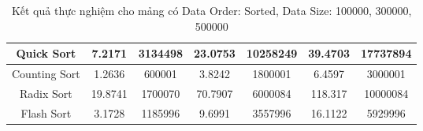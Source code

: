 \begin{table}[H]
{\begin{tabular}{|ccccccc|}
\multicolumn{1}{|c|}{Quick Sort} & \multicolumn{1}{c|}{7.2171} & \multicolumn{1}{c|}{3134498} & \multicolumn{1}{c|}{23.0753} & \multicolumn{1}{c|}{10258249} & \multicolumn{1}{c|}{39.4703} & \multicolumn{1}{c|}{17737894} \\ \hline
\multicolumn{1}{|c|}{Counting Sort} & \multicolumn{1}{c|}{1.2636} & \multicolumn{1}{c|}{600001} & \multicolumn{1}{c|}{3.8242} & \multicolumn{1}{c|}{1800001} & \multicolumn{1}{c|}{6.4597} & \multicolumn{1}{c|}{3000001} \\ \hline
\multicolumn{1}{|c|}{Radix Sort} & \multicolumn{1}{c|}{19.8741} & \multicolumn{1}{c|}{1700070} & \multicolumn{1}{c|}{70.7907} & \multicolumn{1}{c|}{6000084} & \multicolumn{1}{c|}{118.317} & \multicolumn{1}{c|}{10000084} \\ \hline
\multicolumn{1}{|c|}{Flash Sort} & \multicolumn{1}{c|}{3.1728} & \multicolumn{1}{c|}{1185996} & \multicolumn{1}{c|}{9.6991} & \multicolumn{1}{c|}{3557996} & \multicolumn{1}{c|}{16.1122} & \multicolumn{1}{c|}{5929996} \\ \hline
\end{tabular}%
}
\caption{Kết quả thực nghiệm cho mảng có Data Order: Sorted, Data Size: 100000, 300000, 500000}
\label{tab:sorted_100000_300000_500000}
\end{table}

